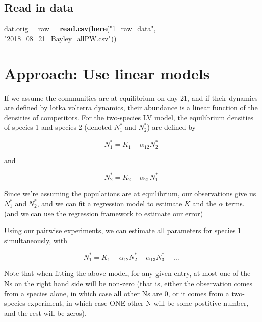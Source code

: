 \documentclass[
]{article}
\newenvironment{Shaded}{\begin{snugshade}}{\end{snugshade}}
\newcommand{\FunctionTok}[1]{\textcolor[rgb]{0.13,0.29,0.53}{\textbf{#1}}}
\newcommand{\NormalTok}[1]{#1}
\newcommand{\OtherTok}[1]{\textcolor[rgb]{0.56,0.35,0.01}{#1}}
\newcommand{\StringTok}[1]{\textcolor[rgb]{0.31,0.60,0.02}{#1}}
\begin{document}
\hypertarget{read-in-data}{%
\subsection{Read in data}\label{read-in-data}}

\begin{Shaded}
\begin{Highlighting}[]
\NormalTok{dat.orig }\OtherTok{=}\NormalTok{ raw }\OtherTok{=} \FunctionTok{read.csv}\NormalTok{(}\FunctionTok{here}\NormalTok{(}\StringTok{"1\_raw\_data"}\NormalTok{,}
                               \StringTok{"2018\_08\_21\_Bayley\_allPW.csv"}\NormalTok{))}
\end{Highlighting}
\end{Shaded}

\hypertarget{approach-use-linear-models}{%
\section{Approach: Use linear models}\label{approach-use-linear-models}}

If we assume the communities are at equilibrium on day 21, and if their
dynamics are defined by lotka volterra dynamics, their abundance is a
linear function of the densities of competitors. For the two-species LV
model, the equilibrium densities of species 1 and species 2 (denoted
\(N_1^*\) and \(N_2^*\)) are defined by

\[N_1^* = K_1 - \alpha_{12}N_2^*\]

and

\[N_2^* = K_2 - \alpha_{21}N_1^*\]

Since we're assuming the populations are at equilibrium, our
observations give us \(N_1^*\) and \(N_2^*\), and we can fit a
regression model to estimate \(K\) and the \(\alpha\) terms. (and we can
use the regression framework to estimate our error)

Using our pairwise experiments, we can estimate all parameters for
species 1 simultaneously, with

\[N_1^* = K_1 - \alpha_{12}N_2^* - \alpha_{13}N_3^*-\dots\]

Note that when fitting the above model, for any given entry, at most one
of the Ns on the right hand side will be non-zero (that is, either the
observation comes from a species alone, in which case all other Ns are
0, or it comes from a two-species experiment, in which case ONE other N
will be some postitive number, and the rest will be zeros).
\end{document}
